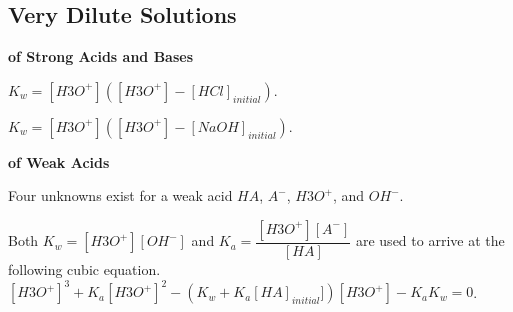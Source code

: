 \documentclass[a4paper,12pt]{article}
\begin{document}
\subsection{Very Dilute Solutions}
\textbf{of Strong Acids and Bases}\par
$K_{w} = [H3O^{+}] ([H3O^{+}] - [HCl]_{initial})$.\par
$K_{w} = [H3O^{+}] ([H3O^{+}] - [NaOH]_{initial})$.\par
\textbf{of Weak Acids}\par
Four unknowns exist for a weak acid $HA$, $A^{-}$, $H3O^{+}$, and $OH^{-}$.\par
Both $K_{w} = [H3O^{+}][OH^{-}]$ and $K_{a} = \dfrac{[H3O^{+}][A^{-}]}{[HA]}$ are used to arrive at the following cubic equation.
$[H3O^{+}]^{3} + K_{a}[H3O^{+}]^{2} - (K_{w} + K_{a}[HA]_{initial}])[H3O^{+}] - K_{a}K_{w} = 0$.









\newpage
\end{document}
